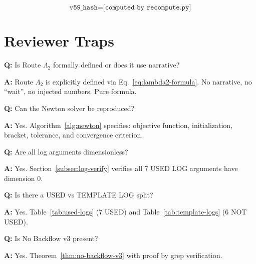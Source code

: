 \documentclass[11pt,a4paper]{article}
\theoremstyle{definition}
\begin{document}
\begin{hashbox}
\begin{equation}
\label{eq:v59-hash}
\texttt{v59\_hash} = \texttt{[computed by recompute.py]}
\end{equation}
\end{hashbox}

\section{Reviewer Traps}
\label{sec:traps}

\begin{trapbox}
\textbf{Q:} Is Route $\Lambda_2$ formally defined or does it use narrative?

\textbf{A:} Route $\Lambda_2$ is explicitly defined via Eq.~\eqref{eq:lambda2-formula}.
No narrative, no ``wait'', no injected numbers. Pure formula.
\end{trapbox}

\begin{trapbox}
\textbf{Q:} Can the Newton solver be reproduced?

\textbf{A:} Yes. Algorithm~\ref{alg:newton} specifies: objective function,
initialization, bracket, tolerance, and convergence criterion.
\end{trapbox}

\begin{trapbox}
\textbf{Q:} Are all log arguments dimensionless?

\textbf{A:} Yes. Section~\ref{subsec:log-verify} verifies all 7 USED LOG
arguments have dimension 0.
\end{trapbox}

\begin{trapbox}
\textbf{Q:} Is there a USED vs TEMPLATE LOG split?

\textbf{A:} Yes. Table~\ref{tab:used-logs} (7 USED) and Table~\ref{tab:template-logs}
(6 NOT USED).
\end{trapbox}

\begin{trapbox}
\textbf{Q:} Is No Backflow v3 present?

\textbf{A:} Yes. Theorem~\ref{thm:no-backflow-v3} with proof by grep verification.
\end{trapbox}
\end{document}
